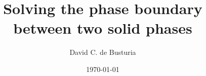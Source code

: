 \documentclass{beamer}
\title[Your Short Title]{Solving the phase boundary between two solid phases}
\author{David C. de Busturia}
\institute{Department of Chemistry. Imperial College London}
\date{\today} %
\begin{document}
\def\folders{10.00K,
30.10K,
50.20K,
70.30K,
90.40K,
110.51K,
130.61K,
150.71K,
170.81K,
190.91K,
211.01K,
231.11K,
251.21K,
271.31K,
291.41K,
311.52K,
331.62K,
351.72K}



\newcommand{\Funkytable}[1]{
$T = {#1}$
}



\begin{frame}
  \titlepage
\end{frame}
\end{document}
